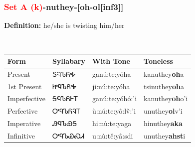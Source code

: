 \subsubsection*{\textcolor{Red}{Set A (k)}{-}\textbf{nuthey}{-}[oh-ol[inf3]]}
\nopagebreak
\textbf{Definition: } he/she is twisting him/her
\\[0.5em]
\begin{tabularx}{\textwidth}{l X X X}%
\toprule%
\textbf{Form}&\textbf{Syllabary}&\textbf{With Tone}&\textbf{Toneless}\\%
\midrule%
Present&ᎦᏄᏖᏲᎭ&ganú:te:yóha&kanuthey\textbf{oh}a\\%
1st Present&ᏥᏄᏖᏲᎭ&ji:nú:te:yóha&tsinuthey\textbf{oh}a\\%
Imperfective&ᎦᏄᏖᏲᎰᎢ&ganú:te:yóhó:’i&kanuthey\textbf{oh}o'i\\%
Perfective&ᎤᏄᏖᏲᎸᎢ&ù:nú:te:yô:lv̌:’i&unuthey\textbf{ol}v'i\\%
Imperative&ᎯᏄᏖᏯᎦ&hi:nù:te:yaga&hinuthey\textbf{aka}\\%
Infinitive&ᎤᏄᏖᏯᏍᏗ&u:nù:tě:yâ:sdi&unuthey\textbf{ahst}i\\%
\bottomrule%
\end{tabularx}
\\[1em]